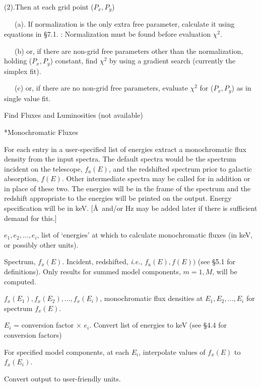 {\listlist

(2).Then at each grid point ($P_x, P_y$)

~~~(a). If normalization is the only extra free parameter, calculate it
using equations in \S 7.1. :  Normalization
must be found before evaluation $\chi^{2}$.
 
~~~(b) or, if there are non-grid free parameters other than the normalization,
holding ($P_x,P_y$) constant,  find $\chi^{2}$ by using a gradient
search (currently the simplex fit).
 
~~~(c) or, if there are no non-grid free parameters,
evaluate $\chi^{2}$ for ($P_x,P_y$) as in single value fit.
 
}

\@{Find Fluxes and Luminosities (not available)}

 
\**Monochromatic Fluxes 

{\list


For each entry in a user-specified list of energies extract a
monochromatic flux density from the input spectra.  The default spectra
would be the spectrum incident on the telescope, $f_a(E)$, and the redshifted spectrum
prior to galactic absorption,  $f(E)$.  Other intermediate
spectra may be called
for in addition or in place of these two.  The energies will be in the frame
of the spectrum and the redshift appropriate to the energies will be
printed on the output.  Energy specification will be in keV.
[\AA~and/or Hz may
be added later if there is sufficient demand for this.]


$e_1, e_2,\ldots,e_i$, list of `energies' at which to
calculate monochromatic fluxes (in keV, or possibly other units).

Spectrum, $f_{x}(E)$.  Incident, redshifted,
{\it i.e.}, $f_a(E), f(E))$
(see \S5.1 for definitions).  Only results for summed model components,
$m=1,M$, will be computed. 

 
$f_x(E_1), f_x(E_2), \ldots, f_x(E_i)$, monochromatic flux densities
at $E_1, E_2, \ldots, E_i$ for spectrum $f_x(E)$.


$E_i$ = conversion factor $\times$ $e_i$.  Convert list of energies to keV (see
\S4.4 for conversion factors)

For specified model components, at each $E_i$, interpolate
values of $f_{x}(E)$ to $f_{x}(E_i)$.

Convert output to user-friendly units.

}
 
